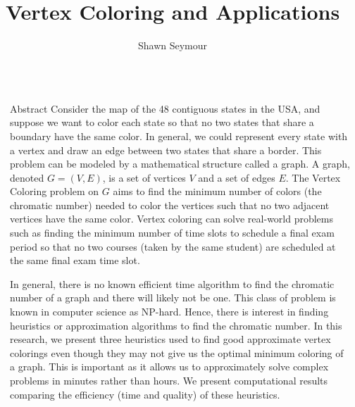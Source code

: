 \documentclass[final]{beamer}
\title{Vertex Coloring and Applications}
\author{Shawn Seymour}
\institute{Advisor: Dr. Peh Ng}
\newlength{\sepwid}
\newlength{\onecolwid}
\begin{document}
\begin{frame}[t]
  \begin{columns}[t]												%
    \begin{column}{\sepwid}\end{column}			%
    \begin{column}{\onecolwid}
      \begin{block}{Abstract}
        \small
        Consider the map of the 48 contiguous states in the USA, and suppose we want to color each state so that no two states that share a boundary have the same color. In general, we could represent every state with a vertex and draw an edge between two states that share a border. This problem can be modeled by a mathematical structure called a graph. A graph, denoted $G = (V, E)$, is a set of vertices $V$ and a set of edges $E$. The Vertex Coloring problem on $G$ aims to find the minimum number of colors (the chromatic number) needed to color the vertices such that no two adjacent vertices have the same color. Vertex coloring can solve real-world problems such as finding the minimum number of time slots to schedule a final exam period so that no two courses (taken by the same student) are scheduled at the same final exam time slot.

        \vspace{0.4cm}
        In general, there is no known efficient time algorithm to find the chromatic number of a graph and there will likely not be one. This class of problem is known in computer science as NP-hard. Hence, there is interest in finding heuristics or approximation algorithms to find the chromatic number. In this research, we present three heuristics used to find good approximate vertex colorings even though they may not give us the optimal minimum coloring of a graph. This is important as it allows us to approximately solve complex problems in minutes rather than hours. We present computational results comparing the efficiency (time and quality) of these heuristics.


\end{block}
\end{column}
\end{columns}
\end{frame}
\end{document}
